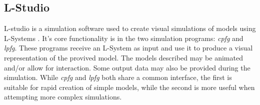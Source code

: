 \documentclass{acmtog}
\begin{document}
\subsection{L-Studio}
\label{subsec:lstudio}

L-studio is a simulation software used to create visual simulations of models using L-Systems \cite{LSTUDIO}.
It's core functionality is in the two simulation programs: \emph{cpfg} and \emph{lpfg}. These programs receive an L-System as input and use it to produce a visual representation of the provived model. The models described may be animated and/or allow for interaction. Some output data may also be provided during the simulation. While \emph{cpfg} and \emph{lpfg} both share a common interface, the first is suitable for rapid creation of simple models, while the second is more useful when attempting more complex simulations.



\nocite{*}



\end{document}
